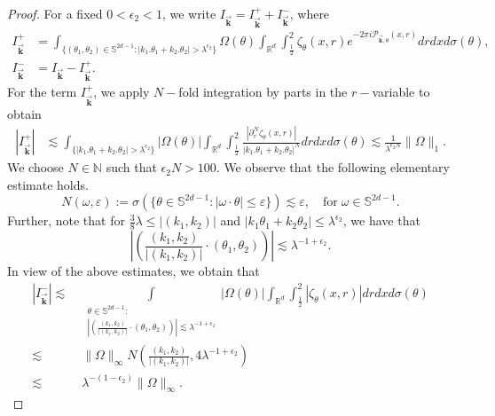 \documentclass[10pt,a4paper]{amsart}
\newcommand{\N}{{\mathbb N}}
\newcommand{\R}{{\mathbb R}}       %
\newcommand{\Sp}{{\mathbb S}}
\begin{document}
\begin{proof}
	For a fixed $0<\epsilon_2<1$, we write $I_{\vec{\mathbf{k}}}=I_{\vec{\mathbf{k}}}^++I_{\vec{\mathbf{k}}}^-$, where
\begin{align*}
	I_{\vec{\mathbf{k}}}^+&=\int_{\{(\theta_1,\theta_2)\in\Sp^{2d-1}:|k_1.\theta_1+k_2.\theta_2|>\lambda^{\epsilon_2}\}}\Omega(\theta)\int_{\R^d}\int_{\frac{1}{2}}^2\zeta_{\theta}(x,r)e^{-2\pi i\mathcal{P}_{\vec{\mathbf{k}},\theta}(x,r)}drdxd\sigma(\theta),\\
	I_{\vec{\mathbf{k}}}^-&=I_{\vec{\mathbf{k}}}-I_{\vec{\mathbf{k}}}^+.
\end{align*}
For the term $I_{\vec{\mathbf{k}}}^+$, we apply $N-$fold integration by parts in the $r-$variable to obtain
\begin{align*}
	\left|I_{\vec{\mathbf{k}}}^+\right|&\lesssim \int_{\{|k_1.\theta_1+k_2.\theta_2|>\lambda^{\epsilon_2}\}}|\Omega(\theta)|\int_{\R^d}\int_{\frac{1}{2}}^2\frac{|\partial_{r}^N\zeta_{\theta}(x,r)|}{|k_1.\theta_1+k_2.\theta_2|^N}drdxd\sigma(\theta)\lesssim \frac{1}{\lambda^{\epsilon_2 N}}\|\Omega\|_1.
\end{align*}
We choose $N\in\N$ such that $\epsilon_2 N>100$.
We observe that the following elementary estimate holds. 
\begin{equation*}
	N(\omega,\varepsilon):=\sigma(\{\theta\in\Sp^{2d-1}:|\omega\cdot\theta|\leq\varepsilon\})\lesssim\varepsilon,\quad \text{for}\;\omega\in\Sp^{2d-1}.
\end{equation*}
Further, note that for $\frac{3}{8}\lambda\leq|(k_1,k_2)|$ and $|k_1\theta_1+k_2\theta_2|\leq\lambda^{\epsilon_2}$, we have that \[\left|\left(\frac{(k_1,k_2)}{|(k_1,k_2)|}\cdot(\theta_1,\theta_2)\right)\right|\lesssim\lambda^{-1+\epsilon_2}.\] 
In view of the above estimates, we obtain that
\begin{align*}
	|I_{\vec{\mathbf{k}}}^-|\lesssim\;&\int\limits_{\substack{\theta\in\Sp^{2d-1}:\\\left|\left(\frac{(k_1,k_2)}{|(k_1,k_2)|}\cdot(\theta_1,\theta_2)\right)\right|\lesssim\lambda^{-1+\epsilon_2}}}|\Omega(\theta)|\int_{\R^d}\int_{\frac{1}{2}}^2|\zeta_{\theta}(x,r)|drdxd\sigma(\theta)\\
	\lesssim\;&\|\Omega\|_\infty N\left(\frac{(k_1,k_2)}{|(k_1,k_2)|},4\lambda^{-1+\epsilon_2}\right)\\
	\lesssim\;&\lambda^{-(1-\epsilon_2)}\|\Omega\|_\infty.
\end{align*}
\end{proof}
\end{document}
